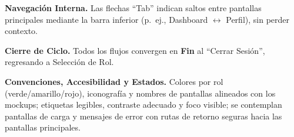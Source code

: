 \begin{samepage}
\noindent \textbf{Navegación Interna.} Las flechas ``Tab'' indican saltos entre pantallas principales mediante la barra inferior (p.~ej., Dashboard $\leftrightarrow$ Perfil), sin perder contexto.

\noindent \textbf{Cierre de Ciclo.} Todos los flujos convergen en \textbf{Fin} al ``Cerrar Sesión'', regresando a Selección de Rol.

\noindent \textbf{Convenciones, Accesibilidad y Estados.} Colores por rol (verde/amarillo/rojo), iconografía y nombres de pantallas alineados con los mockups; etiquetas legibles, contraste adecuado y foco visible; se contemplan pantallas de carga y mensajes de error con rutas de retorno seguras hacia las pantallas principales.
\normalsize\end{samepage}